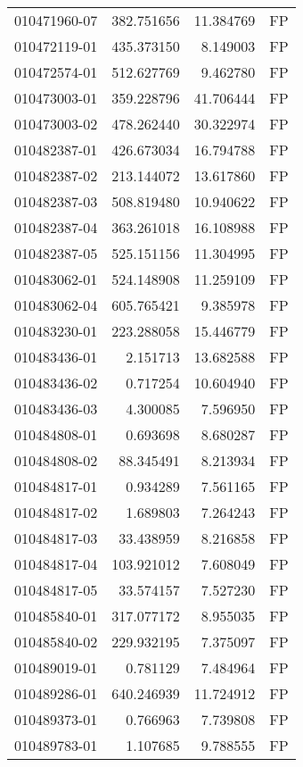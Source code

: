 \begin{tabular}{lrrl}
010471960-07 &  382.751656 &    11.384769 &   FP \\
010472119-01 &  435.373150 &     8.149003 &   FP \\
010472574-01 &  512.627769 &     9.462780 &   FP \\
010473003-01 &  359.228796 &    41.706444 &   FP \\
010473003-02 &  478.262440 &    30.322974 &   FP \\
010482387-01 &  426.673034 &    16.794788 &   FP \\
010482387-02 &  213.144072 &    13.617860 &   FP \\
010482387-03 &  508.819480 &    10.940622 &   FP \\
010482387-04 &  363.261018 &    16.108988 &   FP \\
010482387-05 &  525.151156 &    11.304995 &   FP \\
010483062-01 &  524.148908 &    11.259109 &   FP \\
010483062-04 &  605.765421 &     9.385978 &   FP \\
010483230-01 &  223.288058 &    15.446779 &   FP \\
010483436-01 &    2.151713 &    13.682588 &   FP \\
010483436-02 &    0.717254 &    10.604940 &   FP \\
010483436-03 &    4.300085 &     7.596950 &   FP \\
010484808-01 &    0.693698 &     8.680287 &   FP \\
010484808-02 &   88.345491 &     8.213934 &   FP \\
010484817-01 &    0.934289 &     7.561165 &   FP \\
010484817-02 &    1.689803 &     7.264243 &   FP \\
010484817-03 &   33.438959 &     8.216858 &   FP \\
010484817-04 &  103.921012 &     7.608049 &   FP \\
010484817-05 &   33.574157 &     7.527230 &   FP \\
010485840-01 &  317.077172 &     8.955035 &   FP \\
010485840-02 &  229.932195 &     7.375097 &   FP \\
010489019-01 &    0.781129 &     7.484964 &   FP \\
010489286-01 &  640.246939 &    11.724912 &   FP \\
010489373-01 &    0.766963 &     7.739808 &   FP \\
010489783-01 &    1.107685 &     9.788555 &   FP \\

\end{tabular}
